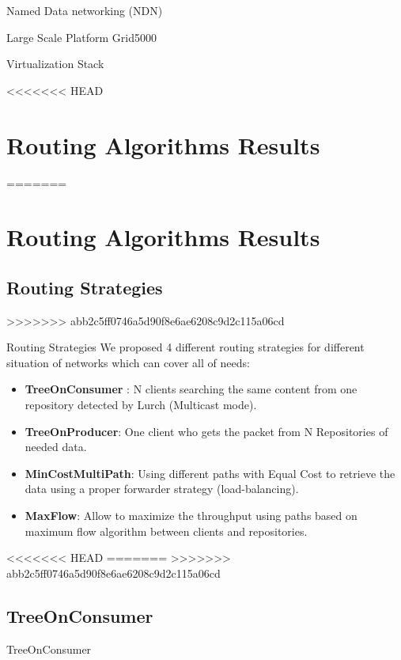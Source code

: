 \documentclass[8pt]{beamer}
\newcommand{\1}{\mathbbm 1}
\begin{document}
\begin{frame}{Named Data networking (NDN)}
\begin{frame}{Large Scale Platform Grid5000}
\begin{frame}{Virtualization Stack}
\end{frame}




<<<<<<< HEAD

\section{Routing Algorithms Results}
=======

\section{Routing Algorithms Results}

\subsection{Routing Strategies}
>>>>>>> abb2c5ff0746a5d90f8e6ae6208c9d2c115a06cd
\begin{frame}{Routing Strategies}
We proposed 4 different routing strategies for different situation of networks which can cover all of needs:
\begin{itemize}

\item \textbf{TreeOnConsumer} : N clients searching the same content from one repository detected by Lurch (Multicast mode).

\item \textbf{TreeOnProducer}: One client who gets the packet from N Repositories of needed data.

\item \textbf{MinCostMultiPath}: Using different paths with Equal Cost to retrieve the data using a proper forwarder strategy (load-balancing).

\item \textbf{MaxFlow}: Allow to maximize the throughput using paths based on maximum flow algorithm between clients and repositories.

\end{itemize}
\end{frame}
<<<<<<< HEAD
=======
>>>>>>> abb2c5ff0746a5d90f8e6ae6208c9d2c115a06cd

\subsection{TreeOnConsumer}

\begin{frame}{TreeOnConsumer}


\end{frame}
\end{frame}
\end{frame}
\end{document}
